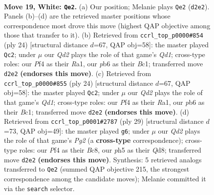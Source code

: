 \documentclass[11pt]{article}
\begin{document}
\begin{figure}[p]
\label{fig:thought-m34}
\end{figure}

\clearpage

\begin{figure}[p]\centering
\begin{subfigure}{0.46\textwidth}\centering
\resizebox{\linewidth}{!}{%
\newchessgame
\chessboard[
  setfen={r1bq1r1k/2pn1pb1/1p1p1np1/3P3p/p1P2P2/2N3PB/PPNQ3P/1RB2RK1 w - - 1 19},
  showmover=false,
  pgfstyle=straightmove, color=movearrow, markmove={d2-e2}
]}
\caption{}
\end{subfigure}\hfill
\begin{subfigure}{0.46\textwidth}\centering
\resizebox{\linewidth}{!}{%
\newchessgame
\chessboard[
  setfen={r1bqr1k1/3nbppp/p2p1n2/1ppP4/4P3/1PNB1N1P/P4PP1/R1BQ1RK1 w - - 1 13},
  showmover=false,
  pgfstyle=straightmove, color=movearrow, markmove={d1-c2}
]}
\caption{}
\end{subfigure}
\\[4pt]
\begin{subfigure}{0.46\textwidth}\centering
\resizebox{\linewidth}{!}{%
\newchessgame
\chessboard[
  setfen={r1bqr1k1/3nbppp/p2p1n2/1ppP4/4P3/1PNB1N1P/P4PP1/R1BQ1RK1 w - - 1 13},
  showmover=false,
  pgfstyle=straightmove, color=movearrow, markmove={d1-c2}
]}
\caption{}
\end{subfigure}\hfill
\begin{subfigure}{0.46\textwidth}\centering
\resizebox{\linewidth}{!}{%
\newchessgame
\chessboard[
  setfen={r1bqnrk1/1p2bppp/2p1n3/3pP3/p2P4/P1N2N1P/1PP1B1PB/R3QR1K b - - 0 15},
  showmover=false,
  pgfstyle=straightmove, color=movearrow, markmove={g7-g6}
]}
\caption{}
\end{subfigure}
\caption{\textbf{Move 19, White: \texttt{Qe2}.} (a) Our position; Melanie plays \texttt{Qe2} (\texttt{d2e2}). Panels (b)--(d) are the retrieved master positions whose correspondence most drove this move (highest QAP objective among those that transfer to it). (b) Retrieved from \texttt{ccrl\_top\_p0000\#854} (ply 24) [structural distance $d$=67, QAP obj=58]: the master played \texttt{Qc2}; under $\mu$ our \emph{Qd2} plays the role of that game's \emph{Qd1}; cross-type roles: our \emph{P}f4 as their \emph{R}a1, our \emph{p}b6 as their \emph{B}c1; transferred move \texttt{d2e2} \textbf{(endorses this move)}. (c) Retrieved from \texttt{ccrl\_top\_p0000\#855} (ply 24) [structural distance $d$=67, QAP obj=58]: the master played \texttt{Qc2}; under $\mu$ our \emph{Qd2} plays the role of that game's \emph{Qd1}; cross-type roles: our \emph{P}f4 as their \emph{R}a1, our \emph{p}b6 as their \emph{B}c1; transferred move \texttt{d2e2} \textbf{(endorses this move)}. (d) Retrieved from \texttt{ccrl\_top\_p0001\#2787} (ply 29) [structural distance $d$=73, QAP obj=49]: the master played \texttt{g6}; under $\mu$ our \emph{Qd2} plays the role of that game's \emph{Pg2} (a \textbf{cross-type} correspondence); cross-type roles: our \emph{P}f4 as their \emph{B}c8, our \emph{p}h5 as their \emph{Q}d8; transferred move \texttt{d2e2} \textbf{(endorses this move)}. Synthesis: 5 retrieved analogs transferred to \texttt{Qe2} (summed QAP objective 215, the strongest correspondence among the candidate moves); Melanie committed it via the \texttt{search} selector.}

\end{figure}
\end{document}
